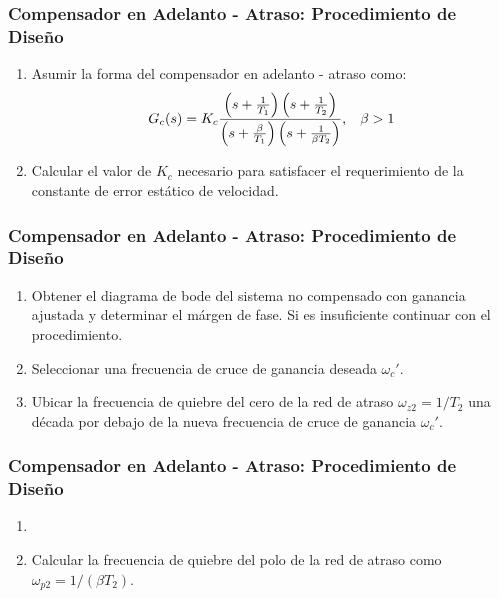 \documentclass[aspectratio=169,handout]{beamer}
\theoremstyle{definition}
\theoremstyle{plain}
\theoremstyle{remark}
\newcounter{saveenumi}
\newcommand{\seti}{\setcounter{saveenumi}{\value{enumi}}}
\newcommand{\conti}{\setcounter{enumi}{\value{saveenumi}}}
\begin{document}
\begin{frame}[c]\frametitle{Compensador en Adelanto - Atraso: Procedimiento de Diseño}
	\begin{enumerate}
		\item<2-> Asumir la forma del compensador en adelanto - atraso como:
		\begin{equation*}
			G_c(s) = K_c \frac{\left(s+\frac{1}{T_1}\right)\left(s+\frac{1}{T_2}\right)}{\left(s+\frac{\beta}{T_1}\right)\left(s+\frac{1}{\beta T_2}\right)}, \hspace*{3mm} \beta > 1
		\end{equation*}
		\item<3-> Calcular el valor de $K_c$ necesario para satisfacer el requerimiento de la constante de error estático de velocidad.
		\seti
	\end{enumerate}		
\end{frame}

\begin{frame}[<+->]\frametitle{Compensador en Adelanto - Atraso: Procedimiento de Diseño}
	\begin{enumerate}
		\conti
		\item Obtener el diagrama de bode del sistema no compensado con ganancia ajustada y determinar el márgen de fase. Si es insuficiente continuar con el procedimiento.
		\item Seleccionar una frecuencia de cruce de ganancia deseada $\omega_c'$.
		\item Ubicar la frecuencia de quiebre del cero de la red de atraso $\omega_{z2} = 1/T_2$ una década por debajo de la nueva frecuencia de cruce de ganancia $\omega_c'$.
		\seti
	\end{enumerate}		
\end{frame}

\begin{frame}[c]\frametitle{Compensador en Adelanto - Atraso: Procedimiento de Diseño}
	\begin{enumerate}
		\conti
		\item {}
		\item<4-> Calcular la frecuencia de quiebre del polo de la red de atraso como $\omega_{p2} = 1/(\beta T_2)$.
		\seti
	\end{enumerate}		
\end{frame}
\end{document}
